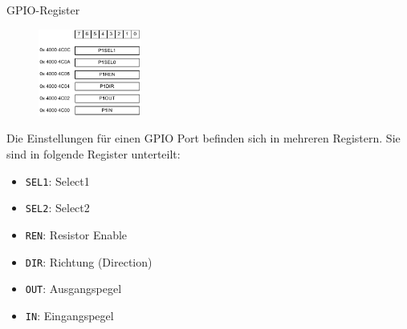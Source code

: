 \begin{defi}{GPIO-Register}
    \begin{figure}
        \begin{center}
            \includegraphics[width=0.3\textwidth]{includes/figures/defi_msp432_port.pdf}
        \end{center}
    \end{figure}

    Die Einstellungen für einen GPIO Port befinden sich in mehreren Registern.
    Sie sind in folgende Register unterteilt:
    \begin{itemize}
        \item \texttt{SEL1}: Select1
        \item \texttt{SEL2}: Select2
        \item \texttt{REN}: Resistor Enable
        \item \texttt{DIR}: Richtung (Direction)
        \item \texttt{OUT}: Ausgangspegel
        \item \texttt{IN}: Eingangspegel
    \end{itemize}
\end{defi}

